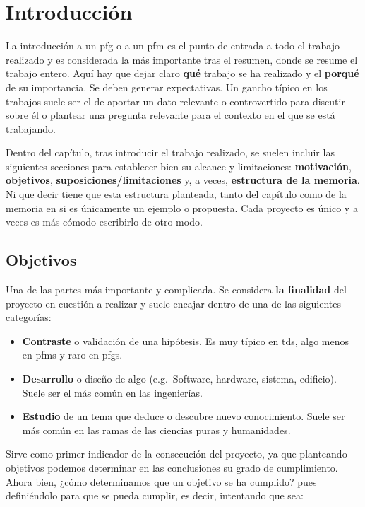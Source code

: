 \chapter{Introducción}
\label{ch:introduccion}

La introducción a un \gls{pfg} o a un \gls{pfm} es el punto de entrada a todo el trabajo realizado y es considerada la más importante tras el resumen, donde se resume el trabajo entero. Aquí hay que dejar claro \textbf{qué} trabajo se ha realizado y el \textbf{porqué} de su importancia. Se deben generar expectativas. Un gancho típico en los trabajos suele ser el de aportar un dato relevante o controvertido para discutir sobre él o plantear una pregunta relevante para el contexto en el que se está trabajando.

Dentro del capítulo, tras introducir el trabajo realizado, se suelen incluir las siguientes secciones para establecer bien su alcance y limitaciones: \textbf{motivación}, \textbf{objetivos}, \textbf{suposiciones/limitaciones} y, a veces, \textbf{estructura de la memoria}. Ni que decir tiene que esta estructura planteada, tanto del capítulo como de la memoria en si es únicamente un ejemplo o propuesta. Cada proyecto es único y a veces es más cómodo escribirlo de otro modo.

\section{Objetivos}

Una de las partes más importante y complicada. Se considera \textbf{la finalidad} del proyecto en cuestión a realizar y suele encajar dentro de una de las siguientes categorías:

\begin{itemize}
    \item \textbf{Contraste} o validación de una hipótesis. Es muy típico en \glspl{td}, algo menos en \glspl{pfm} y raro en \glspl{pfg}.
    \item \textbf{Desarrollo} o diseño de algo (e.g.~Software, hardware, sistema, edificio). Suele ser el más común en las ingenierías.
    \item \textbf{Estudio} de un tema que deduce o descubre nuevo conocimiento. Suele ser más común en las ramas de las ciencias puras y humanidades.
\end{itemize}

Sirve como primer indicador de la consecución del proyecto, ya que planteando objetivos podemos determinar en las conclusiones su grado de cumplimiento. Ahora bien, ¿cómo determinamos que un objetivo se ha cumplido? pues definiéndolo para que se pueda cumplir, es decir, intentando que sea:

